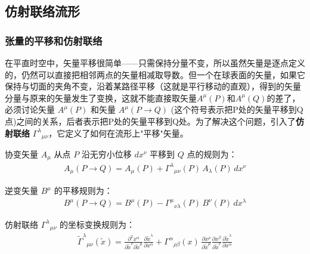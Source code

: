 \subsection{仿射联络流形}
\subsubsection{张量的平移和仿射联络}
在平直时空中，矢量平移很简单——只需保持分量不变，所以虽然矢量是逐点定义的，仍然可以直接把相邻两点的矢量相减取导数。但一个在球表面的矢量，如果它保持与切面的夹角不变，沿着某路径平移（这就是平行移动的直观），得到的矢量分量与原来的矢量发生了变换，这就不能直接取矢量$A^{\mu}(P)$和$A^{\mu}(Q)$的差了，必须讨论矢量 $A^{\mu}(P)$ 和矢量 $A^{\mu}(P\rightarrow Q)$ (这个符号表示把P处的矢量平移到Q点)之间的关系，后者表示把P处的矢量平移到Q处。为了解决这个问题，引入了\textbf{仿射联络} $\Gamma^{\lambda}{}_{\mu\nu}$，它定义了如何在流形上"平移"矢量。
\begin{definition}[协变矢量的平移]
协变矢量 $A_\mu$ 从点 $P$ 沿无穷小位移 $dx^\nu$ 平移到 $Q$ 点的规则为：
\begin{align}
A_\mu(P \to Q) = A_\mu(P) + \Gamma^{\lambda}{}_{\mu\nu}(P)\, A_\lambda(P)\, dx^\nu
\end{align}
\end{definition}

\begin{definition}[逆变矢量的平移]
逆变矢量 $B^\mu$ 的平移规则为：
\begin{align}
B^\mu(P \to Q) = B^\mu(P) - \Gamma^{\mu}{}_{\nu\lambda}(P)\, B^\nu(P)\, dx^\lambda
\end{align}
\end{definition}

\begin{theorem}[仿射联络变换性质]
仿射联络 $\Gamma^{\lambda}{}_{\mu\nu}$ 的坐标变换规则为：
\begin{align}
\widetilde{\Gamma}^{\lambda}{}_{\mu\nu}(\widetilde{x}) =
\frac{\partial^2 x^\alpha}{\partial \widetilde{x}^\nu \partial \widetilde{x}^\mu}
\frac{\partial \widetilde{x}^\lambda}{\partial x^\alpha}
+ \Gamma^{\alpha}{}_{\rho\beta}(x)\,
\frac{\partial x^\rho}{\partial \widetilde{x}^\mu}
\frac{\partial x^\beta}{\partial \widetilde{x}^\nu}
\frac{\partial \widetilde{x}^\lambda}{\partial x^\alpha}
\end{align}
\end{theorem}


